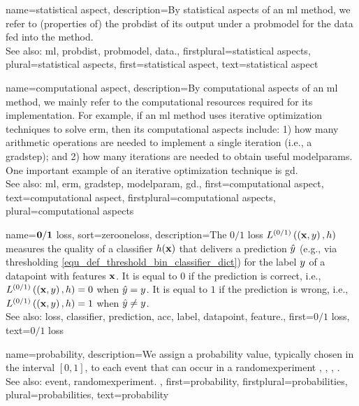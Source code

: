 {name={statistical aspect}, 
	description={By statistical aspects 
		of an \gls{ml} method, we refer to (properties of) the \gls{probdist} of its \gls{output} 
		under a \gls{probmodel} for the \gls{data} fed into the method.
					\\ 
		See also: \gls{ml}, \gls{probdist}, \gls{probmodel}, \gls{data}.},
	firstplural={statistical aspects},
	plural={statistical aspects},
	first={statistical aspect},
	text={statistical aspect}
}

{name={computational aspect}, 
	description={By computational 
		aspects of an \gls{ml} method, we mainly refer to the computational 
		resources required for its implementation. For example, if an \gls{ml} method uses iterative 
		\gls{optimization} techniques to solve \gls{erm}, then its computational aspects include: 1) how 
		many arithmetic operations are needed to implement a single \gls{iteration} (i.e., a \gls{gradstep}); 
		and 2) how many \glspl{iteration} are needed to obtain useful \glspl{modelparam}. One important 
		example of an iterative \gls{optimization} technique is \gls{gd}.
					\\ 
		See also: \gls{ml}, \gls{erm}, \gls{gradstep}, \gls{modelparam}, \gls{gd}.}, 
	first={computational aspect},
	text={computational aspect},
	firstplural={computational aspects},
	plural={computational aspects}
}

{name={$\bf 0/1$ loss},
sort={zerooneloss},
	description={The $0/1$ \gls{loss} $L^{(0/1)}\left(\left( {\bf x},y \right),h \right)$ 
		measures the quality of a \gls{classifier} $h({\bf x})$ that delivers a 
		\gls{prediction} $\hat{y}$ (e.g., via thresholding \eqref{equ_def_threshold_bin_classifier_dict}) 
		for the \gls{label} $y$ of a \gls{datapoint} with \glspl{feature} ${\bf x}$. It is equal to $0$ if 
		the \gls{prediction} is correct, i.e., 
		$L^{(0/1)}\left(\left( {\bf x},y \right),h \right)=0$ when $\hat{y}=y$. It is 
		equal to $1$ if the \gls{prediction} is wrong, i.e., $L^{(0/1)}\left(\left( {\bf x},y \right),h \right)=1$ 
		when $\hat{y}\neq y$.
				\\ 
		See also: \gls{loss}, \gls{classifier}, \gls{prediction}, \gls{acc}, \gls{label}, \gls{datapoint}, \gls{feature}.},
    	first={$0/1$ loss},
	text={$0/1$ loss}
}

{name={probability}, 
	description={We assign a probability value, typically chosen in the 
		interval $[0,1]$, to each \gls{event} that can occur in a \gls{randomexperiment}  
		\cite{BillingsleyProbMeasure}, \cite{BertsekasProb}, \cite{KallenbergBook}, \cite{HalmosMeasure}.
		\\
		See also: \gls{event}, \gls{randomexperiment}. },
	first={probability},
	firstplural={probabilities},
	plural={probabilities},
	text={probability}
}
	
